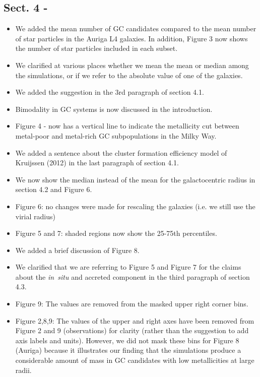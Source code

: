 \documentclass{article}
\begin{document}
\subsection*{Sect. 4 -}
\begin{itemize}
\item We added the mean number of GC candidates compared to the mean number of
star particles in the Auriga L4 galaxies. In addition, Figure 3 now shows the 
number of star particles included in each subset.
\item We clarified at various places whether we mean the mean or median among
the simulations, or if we refer to the absolute value of one of the galaxies.
\item We added the suggestion in the 3rd paragraph of section 4.1.
\item Bimodality in GC systems is now discussed in the introduction.
\item Figure 4 - now has a vertical line to indicate the metallicity cut 
between metal-poor and metal-rich GC subpopulations in the Milky Way.
\item We added a sentence about the cluster formation efficiency model of 
Kruijssen (2012) in the last paragraph of section 4.1.
\item We now show the median instead of the mean for the galactocentric radius in
section 4.2 and Figure 6.
\item Figure 6: no changes were made for rescaling the galaxies (i.e. we still
use the virial radius)
\item Figure 5 and 7: shaded regions now show the 25-75th percentiles.
\item We added a brief discussion of Figure 8.
\item We clarified that we are referring to Figure 5 and Figure 7 for the claims about
the {\it in~situ} and accreted component in the third paragraph of section 4.3.
\item Figure 9: The values are removed from the masked upper right corner bins.
\item Figure 2,8,9: The values of the upper and right axes have been removed from
Figure 2 and 9 (observations) for clarity (rather than the suggestion to add 
axis labels and units). However, we did not mask these bins for Figure 8 (Auriga)
because it illustrates our finding that the simulations produce a considerable
amount of mass in GC candidates with low metallicities at large radii.
\end{itemize}
\end{document}
